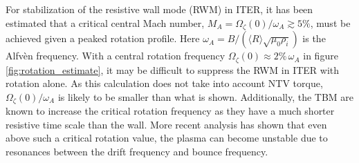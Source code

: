 \documentclass[aip, pop, preprint]{revtex4-1}
\numberwithin{figure}{section}
\numberwithin{equation}{section}
\begin{document}
For stabilization of the resistive wall mode (RWM) in ITER, it has been estimated\cite{Liu2004} that a critical central Mach number, $M_A = \Omega_{\zeta}(0)/\omega_A \gtrsim 5\%$, must be achieved given a peaked rotation profile. Here $\omega_A = B/(\langle R\rangle\sqrt{\mu_0 \rho_i})$ is the Alfv\`{e}n frequency. With a central rotation frequency $\Omega_{\zeta}(0) \approx 2\% \, \omega_A$ in figure \ref{fig:rotation_estimate}, it may be difficult to suppress the RWM in ITER with rotation alone. As this calculation does not take into account NTV torque, $\Omega_{\zeta}(0)/\omega_A$ is likely to be smaller than what is shown. Additionally, the TBM are known to increase the critical rotation frequency as they have a much shorter resistive time scale than the wall.\cite{Liu2004} More recent analysis has shown that even above such a critical rotation value, the plasma can become unstable due to resonances between the drift frequency and bounce frequency.\cite{Berkery2010, Liu2009}

\FloatBarrier
\end{document}
